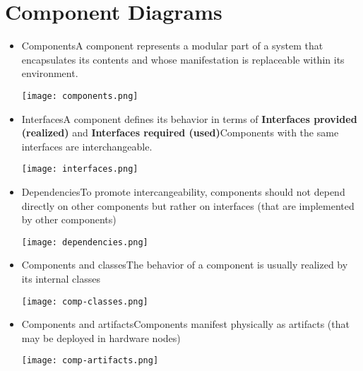 \documentclass[../ESOF_notes.tex]{subfiles}
\begin{document}
\section{Component Diagrams}
\begin{itemize}

    \item Components\newline A component represents a modular part of a system that encapsulates its contents and whose manifestation is replaceable within its environment.
    \begin{center}
        \texttt{[image: components.png]}
    \end{center}
    
    \item Interfaces\newline A component defines its behavior in terms of \textbf{Interfaces provided (realized)} and \textbf{Interfaces required (used)}\newline Components with the same interfaces are interchangeable.
    \begin{center}
        \texttt{[image: interfaces.png]}
    \end{center}
    
    \item Dependencies\newline To promote intercangeability, components should not depend directly on other components but rather on interfaces (that are implemented by other components)
    \begin{center}
        \texttt{[image: dependencies.png]}
    \end{center}
    
    \item Components and classes\newline The behavior of a component is usually realized by its internal classes
    \begin{center}
        \texttt{[image: comp-classes.png]}
    \end{center}
    
    \item Components and artifacts\newline Components manifest physically as artifacts (that may be deployed in hardware nodes)
    \begin{center}
        \texttt{[image: comp-artifacts.png]}
    \end{center}
\end{itemize}
\end{document}

